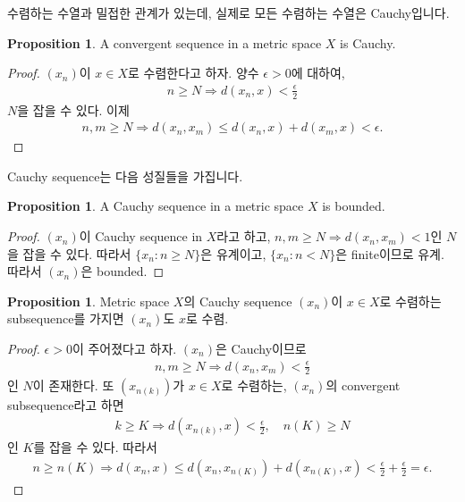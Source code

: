 \documentclass[12pt]{article}
\theoremstyle{definition}
\newtheorem{prop}[thm]{Proposition}
\def\eps{\epsilon}
\begin{document}
수렴하는 수열과 밀접한 관계가 있는데, 실제로 모든 수렴하는 수열은 Cauchy입니다.

	\begin{prop}
		A convergent sequence in a metric space \(X\) is Cauchy.
	\end{prop}
	\begin{proof}
		\((x_n)\)이 \(x \in X\)로 수렴한다고 하자. 양수 \(\eps > 0\)에 대하여,
		\begin{gather*}
			n \ge N \Longrightarrow d(x_n, x) < \frac{\eps}{2}
		\end{gather*}
		\(N\)을 잡을 수 있다. 이제
		\begin{gather*}
			n, m \ge N \Longrightarrow d(x_n, x_m) \le d(x_n, x) + d(x_m, x) < \eps.
		\end{gather*}
	\end{proof}

Cauchy sequence는 다음 성질들을 가집니다.

	\begin{prop} \label{cauchy bdd}
		A Cauchy sequence in a metric space \(X\) is bounded.
	\end{prop}
	\begin{proof}
		\((x_n)\)이 Cauchy sequence in \(X\)라고 하고, \(n, m \ge N \Rightarrow d(x_n, x_m) < 1\)인 \(N\)을 잡을 수 있다. 따라서 \(\{x_n: n \ge N\}\)은 유계이고, \(\{x_n: n < N\}\)은 finite이므로 유계. 따라서 \((x_n)\)은 bounded.
	\end{proof}

	\begin{prop} \label{cauchy subs}
		Metric space \(X\)의 Cauchy sequence \((x_n)\)이 \(x \in X\)로 수렴하는 subsequence를 가지면 \((x_n)\)도 \(x\)로 수렴.
	\end{prop}
	\begin{proof}
		\(\eps > 0\)이 주어졌다고 하자. \((x_n)\)은 Cauchy이므로
		\begin{gather*}
			n, m \ge N \Longrightarrow d(x_n, x_m) < \frac{\eps}{2}
		\end{gather*}
		인 \(N\)이 존재한다. 또 \((x_{n(k)})\)가 \(x \in X\)로 수렴하는, \((x_n)\)의 convergent subsequence라고 하면
		\begin{gather*}
			k \ge K \Longrightarrow d(x_{n(k)}, x) < \frac{\eps}{2}, \quad n(K) \ge N
		\end{gather*}
		인 \(K\)를 잡을 수 있다. 따라서
		\begin{gather*}
			n \ge n(K) \Longrightarrow d(x_n, x) \le d(x_n, x_{n(K)}) + d(x_{n(K)}, x) < \frac{\eps}{2} + \frac{\eps}{2} = \eps.
		\end{gather*}
	\end{proof}
\end{document}
